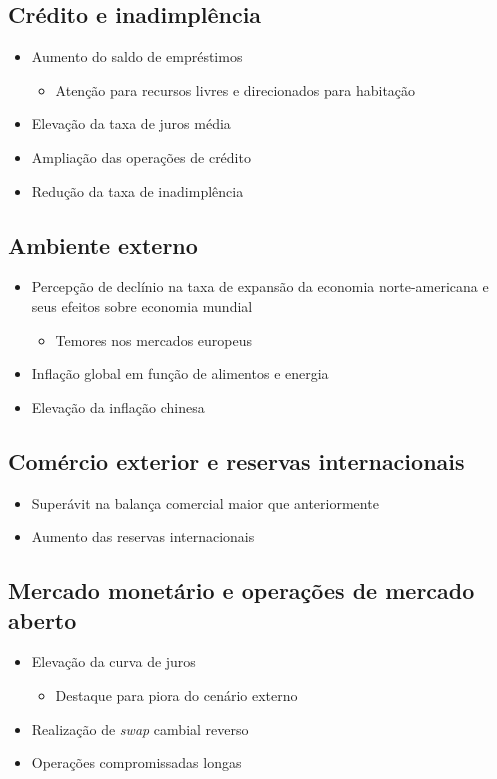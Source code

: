 \documentclass[11pt]{article}
\begin{document}
\subsection*{Crédito e inadimplência}
\label{sec:orgf175e45}
\begin{itemize}
\item Aumento do saldo de empréstimos
\begin{itemize}
\item Atenção para recursos livres e direcionados para habitação
\end{itemize}
\item Elevação da taxa de juros média
\item Ampliação das operações de crédito
\item Redução da taxa de inadimplência
\end{itemize}
\subsection*{Ambiente externo}
\label{sec:org3ec212b}
\begin{itemize}
\item Percepção de declínio na taxa de expansão da economia norte-americana  e seus efeitos sobre economia mundial
\begin{itemize}
\item Temores nos mercados europeus
\end{itemize}
\item Inflação global em função de alimentos e energia
\item Elevação da inflação chinesa
\end{itemize}
\subsection*{Comércio exterior e reservas internacionais}
\label{sec:orge935117}
\begin{itemize}
\item Superávit na balança comercial maior que anteriormente
\item Aumento das reservas internacionais
\end{itemize}
\subsection*{Mercado monetário e operações de mercado aberto}
\label{sec:orgbb834dc}
\begin{itemize}
\item Elevação da curva de juros
\begin{itemize}
\item Destaque para piora do cenário externo
\end{itemize}
\item Realização de \emph{swap} cambial reverso
\item Operações compromissadas longas
\end{itemize}
\end{document}

